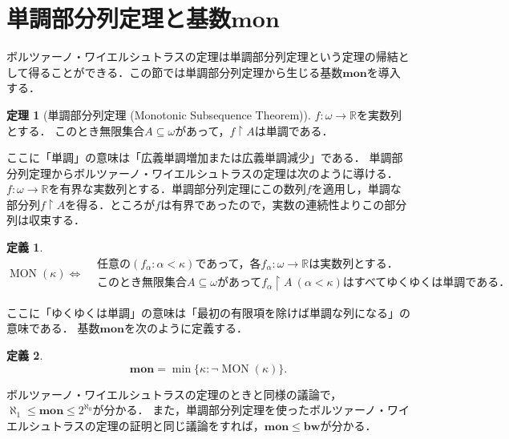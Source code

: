 \documentclass[uplatex,dvipdfmx]{jsarticle}
\newcommand{\R}{\mathbb{R}}
\renewcommand\subset{\subseteq}
\newcommand{\MON}{\operatorname{MON}}
\theoremstyle{definition}
\newtheorem*{thm*}{定理}
\newtheorem*{defi*}{定義}
\theoremstyle{named}
\begin{document}
\section{単調部分列定理と基数$\mathbf{mon}$}

ボルツァーノ・ワイエルシュトラスの定理は単調部分列定理という定理の帰結として得ることができる．この節では単調部分列定理から生じる基数$\mathbf{mon}$を導入する．

\begin{framed}
\begin{thm*}[単調部分列定理 (Monotonic Subsequence Theorem)]
$f: \omega \to \R$を実数列とする．
このとき無限集合$A \subset \omega$があって，$f \upharpoonright A$は単調である．
\end{thm*}
\end{framed}

ここに「単調」の意味は「広義単調増加または広義単調減少」である．
単調部分列定理からボルツァーノ・ワイエルシュトラスの定理は次のように導ける．
$f : \omega \to \R$を有界な実数列とする．単調部分列定理にこの数列$f$を適用し，単調な部分列$f \upharpoonright A$を得る．ところが$f$は有界であったので，実数の連続性よりこの部分列は収束する．


\begin{framed}
\begin{defi*}
\[
\MON(\kappa) \iff \begin{aligned}
&\text{任意の$(f_\alpha : \alpha < \kappa)$であって，各$f_\alpha: \omega \to \R$は実数列とする．} \\
&\text{このとき無限集合$A \subset \omega$があって$f_\alpha \upharpoonright A \ (\alpha < \kappa)$はすべてゆくゆくは単調である．}
\end{aligned}
\]
\end{defi*}
\end{framed}

ここに「ゆくゆくは単調」の意味は「最初の有限項を除けば単調な列になる」の意味である．
基数$\mathbf{mon}$を次のように定義する．

\begin{framed}
\begin{defi*}
\[
\mathbf{mon} = \min \{ \kappa : \neg \MON(\kappa) \}.
\]
\end{defi*}
\end{framed}

ボルツァーノ・ワイエルシュトラスの定理のときと同様の議論で，$\aleph_1 \le \mathbf{mon} \le 2^{\aleph_0}$が分かる．
また，単調部分列定理を使ったボルツァーノ・ワイエルシュトラスの定理の証明と同じ議論をすれば，$\mathbf{mon} \le \mathbf{bw}$が分かる．
\end{document}

